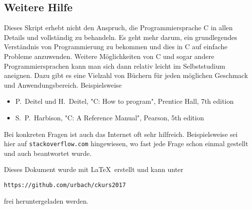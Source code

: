 \subsection{Weitere Hilfe}

Dieses Skript erhebt nicht den Anspruch, die Programmiersprache C in allen Details und vollständig zu behandeln.
Es geht mehr darum, ein grundlegendes Verständnis von Programmierung zu bekommen und dies in C auf einfache Probleme anzuwenden.
Weitere Möglichkeiten von C und sogar andere Programmiersprachen kann man sich dann relativ leicht im Selbststudium aneignen.
Dazu gibt es eine Vielzahl von Büchern für jeden möglichen Geschmack und Anwendungsbereich.
Beispielsweise
\begin{itemize}
\item P.~Deitel und H.~Deitel, "C: How to program", Prentice Hall, 7th edition
\item S.~P.~Harbison, "C: A Reference Manual", Pearson, 5th edition
\end{itemize}
Bei konkreten Fragen ist auch das Internet oft sehr hilfreich.
Beispielsweise sei hier auf \texttt{stackoverflow.com} hingewiesen, wo fast jede Frage schon einmal gestellt und auch beantwortet wurde.

Dieses Dokument wurde mit \LaTeX\ erstellt und kann unter 
\begin{center}
  \texttt{https://github.com/urbach/ckurs2017} 
\end{center}
frei heruntergeladen werden.
